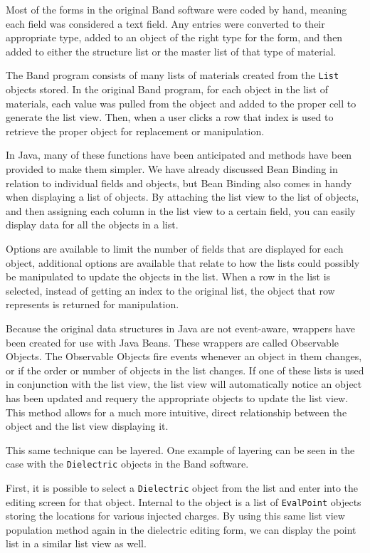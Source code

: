 \documentclass[project]{bsu-ms}
\begin{document}
Most of the forms in the original Band software were coded by hand, meaning each field was considered a text field. Any entries were converted to their appropriate type, added to an object of the right type for the form, and then added to either the structure list or the master list of that type of material.

The Band program consists of many lists of materials created from the \texttt{List} objects stored. In the original Band program, for each object in the list of materials, each value was pulled from the object and added to the proper cell to generate the list view. Then, when a user clicks a row that index is used to retrieve the proper object for replacement or manipulation. 

In Java, many of these functions have been anticipated and methods have been provided to make them simpler. We have already discussed Bean Binding in relation to individual fields and objects, but Bean Binding also comes in handy when displaying a list of objects. By attaching the list view to the list of objects, and then assigning each column in the list view to a certain field, you can easily display data for all the objects in a list. 

Options are available to limit the number of fields that are displayed for each object, additional options are available that relate to how the lists could possibly be manipulated to update the objects in the list. When a row in the list is selected, instead of getting an index to the original list, the object that row represents is returned for manipulation. 

Because the original data structures in Java are not event-aware, wrappers have been created for use with Java Beans. These wrappers are called Observable Objects. The Observable Objects fire events whenever an object in them changes, or if the order or number of objects in the list changes. If one of these lists is used in conjunction with the list view, the list view will automatically notice an object has been updated and requery the appropriate objects to update the list view. This method allows for a much more intuitive, direct relationship between the object and the list view displaying it. 

This same technique can be layered.  One example of layering can be seen in the case with the \texttt{Dielectric} objects in the Band software. 

First, it is possible to select a \texttt{Dielectric} object from the list and enter into the editing screen for that object. Internal to the object is a list of \texttt{EvalPoint} objects storing the locations for various injected charges. By using this same list view population method again in the dielectric editing form, we can display the point list in a similar list view as well. 
\end{document}
